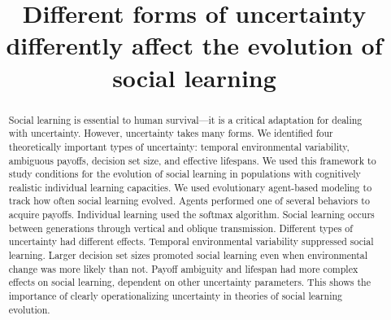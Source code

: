 \documentclass[letterpaper,11.5pt]{scrartcl}
\title{Different forms of uncertainty differently affect the evolution of social learning}
\author{{}}
\begin{document}
\maketitle

\newcommand{\pisub}[1]{\pi_{\mathrm{#1}}}
\newcommand{\pilow}{\pisub{low}}
\newcommand{\pihigh}{\pisub{high}}
\newcommand{\piI}{\langle \pisub{I} \rangle}
\newcommand{\piS}{\langle \pisub{S} \rangle}
\newcommand{\ledger}{\bar\pi_{ib}}

\newcommand{\meanvar}[1]{\langle #1 \rangle}
\newcommand{\meansl}{\meanvar{s}}
\newcommand{\meanpi}{\meanvar{\pi}}
\newcommand{\meansoc}{\meanvar{\pi_\mathrm{S}}}
\newcommand{\meanasoc}{\meanvar{\pi_\mathrm{A}}}
\newcommand{\meanT}{\meanvar{T}}

\newcommand{\bandit}{\text{Bandit}_b(0, 1)}

\begin{abstract} Social learning is essential to human survival---it is a critical
  adaptation for dealing with uncertainty. However, uncertainty takes many forms.
  We identified four theoretically important types of uncertainty: temporal
  environmental variability, ambiguous payoffs, decision set size, and effective
  lifespans. We used this framework to study conditions for the evolution of
  social learning in populations with cognitively realistic individual learning
  capacities.  We used evolutionary agent-based modeling to track how often social
  learning evolved. Agents performed one of several behaviors to acquire payoffs.
  Individual learning used the softmax algorithm. Social learning occurs between
  generations  through vertical and oblique transmission.  Different types of
  uncertainty had different effects. Temporal environmental variability suppressed
  social learning. Larger decision set sizes promoted social learning even
  when environmental change was more likely than not. Payoff
  ambiguity and lifespan had more complex effects on social learning, dependent on
  other uncertainty parameters.  This shows the importance of clearly
  operationalizing uncertainty in theories of social learning evolution.

\end{abstract}
\end{document}
